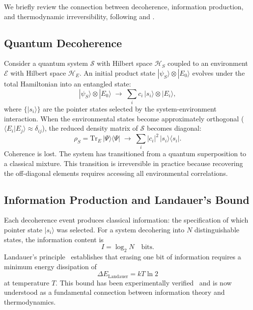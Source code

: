 \documentclass[11pt]{article}
\begin{document}
We briefly review the connection between decoherence, information production,
and thermodynamic irreversibility, following
\citet{Zurek2003} and \citet{Schlosshauer2007}.

\subsection{Quantum Decoherence}

Consider a quantum system $\mathcal{S}$ with Hilbert space $\mathcal{H}_S$
coupled to an environment $\mathcal{E}$ with Hilbert space $\mathcal{H}_E$.
An initial product state $|\psi_S\rangle \otimes |E_0\rangle$ evolves under
the total Hamiltonian into an entangled state:
\begin{equation}
|\psi_S\rangle \otimes |E_0\rangle \;\longrightarrow\;
\sum_i c_i\, |s_i\rangle \otimes |E_i\rangle,
\label{eq:decoherence}
\end{equation}
where $\{|s_i\rangle\}$ are the pointer states selected by the
system-environment interaction.  When the environmental states become
approximately orthogonal ($\langle E_i | E_j \rangle \approx \delta_{ij}$),
the reduced density matrix of $\mathcal{S}$ becomes diagonal:
\begin{equation}
\rho_S = \mathrm{Tr}_E\,|\Psi\rangle\langle\Psi|
\;\longrightarrow\; \sum_i |c_i|^2\,|s_i\rangle\langle s_i|.
\label{eq:reduced_density}
\end{equation}
Coherence is lost.  The system has transitioned from a quantum superposition to
a classical mixture.  This transition is irreversible in practice because
recovering the off-diagonal elements requires accessing all environmental
correlations.

\subsection{Information Production and Landauer's Bound}

Each decoherence event produces classical information: the specification of
which pointer state $|s_i\rangle$ was selected.  For a system decohering into
$N$ distinguishable states, the information content is
\begin{equation}
I = \log_2 N \quad \text{bits}.
\label{eq:info_content}
\end{equation}
Landauer's principle~\citep{Landauer1961} establishes that erasing one bit of
information requires a minimum energy dissipation of
\begin{equation}
\Delta E_\mathrm{Landauer} = kT\ln 2
\label{eq:landauer}
\end{equation}
at temperature $T$.  This bound has been experimentally
verified~\citep{Berut2012,Jun2014} and is now understood as a fundamental
connection between information theory and thermodynamics.
\end{document}
